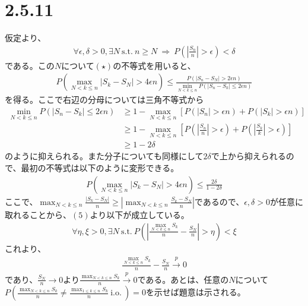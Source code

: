 \documentclass{article}
\begin{document}
\section{2.5.11}
仮定より、
\begin{align*}
	\forall \epsilon, \delta > 0, \exists N\ \text{s.t.}\ n\geq N\ \Rightarrow\  P\left( \left| \frac{S_n}{n} \right| > \epsilon \right) < \delta
\end{align*}
である。この$N$について$(\star)$の不等式を用いると、
\begin{align*}
	P\left( \max_{N<k\leq n} \left|S_k - S_N\right| > 4\epsilon n \right) \leq\frac{P\left( \left| S_n -S_N \right| > 2\epsilon n \right)}{\min_{N<k \leq n}P\left( \left| S_n - S_k \right| \leq 2\epsilon n \right)}
\end{align*}
を得る。ここで右辺の分母については三角不等式から
\begin{align*}
	\min_{N<k \leq n}P\left( \left| S_n - S_k \right| \leq 2\epsilon n \right) &\geq 1 - \max_{N<k \leq n} \left[ P\left( \left| S_n \right| > \epsilon n \right) + P\left( \left| S_k \right| > \epsilon n \right) \right]\\[10pt]
	&\geq 1- \max_{N<k \leq n} \left[ P\left( \left| \frac{S_n}{n} \right| > \epsilon \right) + P\left( \left| \frac{S_k}{k} \right| > \epsilon \right) \right]\\[10pt]
	&\geq 1 - 2 \delta
\end{align*}
のように抑えられる。また分子についても同様にして$2\delta$で上から抑えられるので、最初の不等式は以下のように変形できる。
\begin{align}
	P\left( \max_{N<k\leq n} \left|S_k - S_N\right| > 4\epsilon n \right) \leq \frac{2\delta}{1 - 2\delta}
\end{align}
ここで、$\max_{N<k\leq n} \frac{\left| S_k - S_N \right|}{n} \geq \left| \max_{N<k\leq n} \frac{S_k - S_N}{n} \right|$であるので、$\epsilon, \delta > 0$が任意に取れることから、$(5)$より以下が成立している。
\begin{align*}
	\forall \eta, \xi > 0, \exists N\ \text{s.t.}\ P\left( \left| \frac{\max_{N<k\leq n} S_k}{n} - \frac{S_N}{n} \right| > \eta \right) < \xi
\end{align*}
これより、
\begin{align*}
	 \frac{\max_{N<k\leq n} S_k}{n} - \frac{S_N}{n} \xrightarrow{p} 0
\end{align*}
であり、$\frac{S_N}{n} \to 0$より$\frac{\max_{N<k\leq n} S_k}{n} \xrightarrow{p} 0$である。あとは、任意の$N$について$P\left( \frac{\max_{N<k\leq n} S_k}{n} \neq \frac{\max_{1\leq k\leq n} S_k}{n}\ \text{i.o.}\ \right) = 0$を示せば題意は示される。
\end{document}
